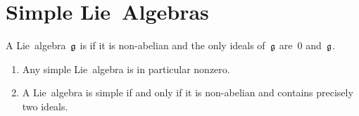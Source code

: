 \section{Simple Lie~Algebras}
\label{simple lie algebras}


\begin{definition}
	A Lie~algebra~$\mathfrak{g}$ is  if it is non-abelian and the only ideals of~$\mathfrak{g}$ are~$0$ and~$\mathfrak{g}$.
\end{definition}


\begin{remark}
	\leavevmode
	\begin{enumerate}
		\item
			Any simple Lie~algebra is in particular nonzero.
		\item
			A Lie~algebra is simple if and only if it is non-abelian and contains precisely two ideals.
	\end{enumerate}
\end{remark}


